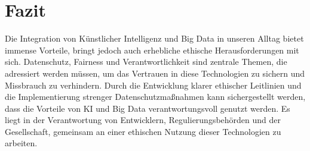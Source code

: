 \chapter{Fazit}
\label{chap:fazit}

Die Integration von Künstlicher Intelligenz und Big Data in unseren Alltag bietet immense Vorteile, bringt jedoch auch erhebliche ethische Herausforderungen mit sich. Datenschutz, Fairness und Verantwortlichkeit sind zentrale Themen, die adressiert werden müssen, um das Vertrauen in diese Technologien zu sichern und Missbrauch zu verhindern. Durch die Entwicklung klarer ethischer Leitlinien und die Implementierung strenger Datenschutzmaßnahmen kann sichergestellt werden, dass die Vorteile von KI und Big Data verantwortungsvoll genutzt werden. Es liegt in der Verantwortung von Entwicklern, Regulierungsbehörden und der Gesellschaft, gemeinsam an einer ethischen Nutzung dieser Technologien zu arbeiten.

